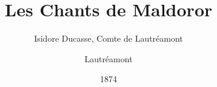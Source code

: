 \makeatletter
\def\thickhrulefill{\leavevmode \leaders \hrule height 1pt\hfill \kern \z@}
\renewcommand{\maketitle}{\begin{titlepage}%
    \let\footnotesize\small
    \let\footnoterule\relax
    \parindent \z@
    \reset@font
    \null
    \vskip 50\p@
    \begin{center}
      \hrule
      \vskip 1pt 
      \hrule
      \vskip 1pt
      {\huge \bfseries \strut \@title \strut}\par
      \vskip 1pt
      \hrule
      \vskip 1pt
      \hrule
    \end{center}
    \vskip 50\p@
    \begin{flushright}
      \Large \@author \par
    \end{flushright}
    \vfil
    \null
  \end{titlepage}%
  \setcounter{footnote}{0}%
}
\makeatother
\author{Isidore Ducasse, Comte de Lautréamont}
\author{Lautréamont}
\title{Les Chants de Maldoror}
\date{1874}
